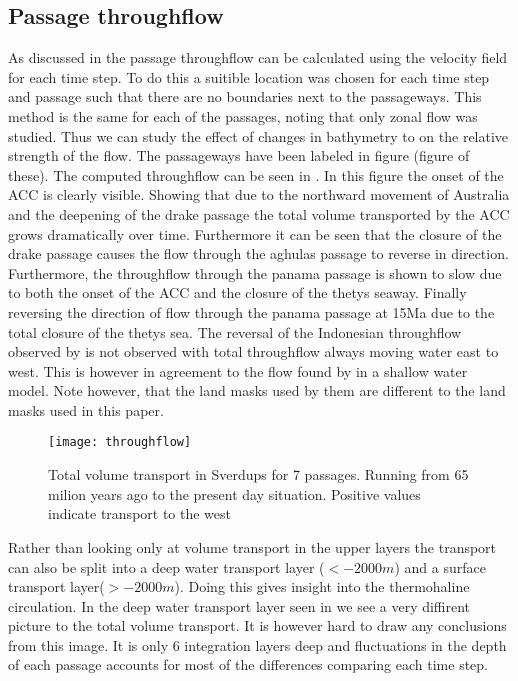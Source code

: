 \subsection{Passage throughflow} \label{sec:throughflow}
As discussed in  the passage throughflow can be calculated using the velocity field for each time step. To do this a suitible location was chosen for each time step and passage such that there are no boundaries next to the passageways. This method is the same for each of the passages, noting that only zonal flow was studied. Thus we can study the effect of changes in bathymetry to on the relative strength of the flow.  The passageways have been labeled in figure (figure of these). The computed throughflow can be seen in . In this figure the onset of the ACC is clearly visible. Showing that due to the northward movement of Australia and the deepening of the drake passage the total volume transported by the ACC grows dramatically over time. Furthermore it can be seen that the closure of the drake passage causes the flow through the aghulas passage to reverse in direction. Furthermore, the throughflow through the panama passage is shown to slow due to both the onset of the ACC and the closure of the thetys seaway. Finally reversing the direction of flow through the panama passage at 15Ma due to the total closure of the thetys sea. The reversal of the Indonesian throughflow observed by \cite{Mulder2017Jul} is not observed with total throughflow always moving water east to west. This is however in agreement to the flow found by \cite{omta2003physical} in a shallow water model. Note however, that the land masks used by them are different to the land masks used in this paper.

\begin{figure}[H]
	\texttt{[image: throughflow]}
	\caption{Total volume transport in Sverdups for 7 passages. Running from 65 milion years ago to the present day situation. Positive values indicate transport to the west}
	\label{fig:throughflow}
\end{figure}

Rather than looking only at volume transport in the upper layers the transport can also be split into a deep water transport layer ($<-2000m$) and a surface transport layer($>-2000m$). Doing this gives insight into the thermohaline circulation. In the deep water transport layer seen in  we see a very diffirent picture to the total volume transport. It is however hard to draw any conclusions from this image. It is only 6 integration layers deep and fluctuations in the depth of each passage accounts for most of the differences comparing each time step.

